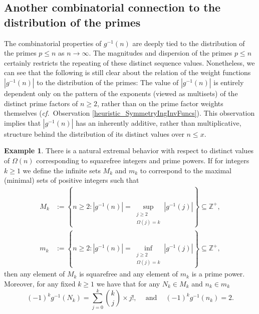 \documentclass[11pt,reqno,a4letter]{article}
\numberwithin{figure}{section}
\numberwithin{table}{section}
\newcommand{\cf}{\textit{cf.\ }}
\theoremstyle{plain}
\numberwithin{theorem}{section}
\theoremstyle{definition}
\newtheorem{example}[theorem]{Example}
\begin{document}
\subsection{Another combinatorial connection to the distribution of the primes} 
\label{subSection_AConnectionToDistOfThePrimes} 

The combinatorial properties of $g^{-1}(n)$ are deeply tied to the distribution of the primes 
$p \leq n$ as $n \rightarrow \infty$. 
The magnitudes and dispersion of the primes $p \leq n$ certainly restricts the 
repeating of these distinct sequence values. 
Nonetheless, we can see that the following 
is still clear about the relation of the weight functions $|g^{-1}(n)|$ to the 
distribution of the primes: 
The value of $|g^{-1}(n)|$ is entirely dependent only on the pattern of the exponents 
(viewed as multisets) of the distinct prime factors of $n \geq 2$, rather than on the 
prime factor weights themselves 
(\cf Observation \ref{heuristic_SymmetryIngInvFuncs}). 
This observation implies that $|g^{-1}(n)|$ has an inherently additive, rather than 
multiplicative, structure behind the distribution of its distinct values over $n \leq x$. 

\begin{example} 
There is a natural extremal behavior with respect to distinct values of $\Omega(n)$ 
corresponding to squarefree integers and prime powers. If for integers 
$k \geq 1$ we define the 
infinite sets $M_k$ and $m_k$ to correspond to the maximal (minimal) sets of 
positive integers such that 
\begin{align*} 
M_k & := \left\{n \geq 2: |g^{-1}(n)| = \underset{{\substack{j \geq 2 \\ \Omega(j) = k}}}{\operatorname{sup}} 
     |g^{-1}(j)|\right\} \subseteq \mathbb{Z}^{+}, \\  
m_k & := \left\{n \geq 2: |g^{-1}(n)| = \underset{{\substack{j \geq 2 \\ \Omega(j) = k}}}{\operatorname{inf}} 
     |g^{-1}(j)|\right\} \subseteq \mathbb{Z}^{+}, 
\end{align*} 
then any element of $M_k$ is squarefree and any element of $m_k$ is a prime power. 
Moreover, for any fixed $k \geq 1$ 
we have that for any $N_k \in M_k$ and $n_k \in m_k$
\[
(-1)^{k} g^{-1}(N_k) = \sum_{j=0}^{k} \binom{k}{j} \times j!, 
     \quad \mathrm{\ and\ } \quad 
     (-1)^{k} g^{-1}(n_k) = 2. 
\]
\end{example}
\end{document}
